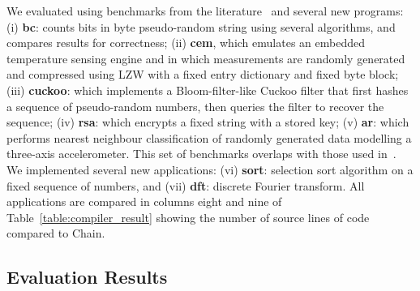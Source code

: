 We evaluated \sys using benchmarks from the literature~\cite{chain,alpaca} and
several new programs: (i) \textbf{bc}: counts bits in byte pseudo-random string
using several algorithms, and compares results for correctness; (ii)
\textbf{cem}, which emulates an embedded temperature sensing engine and in
which measurements are randomly generated and compressed using LZW with a fixed
entry dictionary and fixed byte block; (iii) \textbf{cuckoo}: which implements
a Bloom-filter-like Cuckoo filter that first hashes a sequence of pseudo-random
numbers, then queries the filter to recover the sequence; (iv) \textbf{rsa}:
which encrypts a fixed string with a stored key; (v) \textbf{ar}: which
performs nearest neighbour classification of randomly generated data modelling a
three-axis accelerometer. This set of benchmarks overlaps with those used
in~\cite{chain,alpaca}. We implemented several new applications: (vi)
\textbf{sort}: selection sort algorithm on a fixed sequence of numbers, and
(vii) \textbf{dft}: discrete Fourier transform. All applications are compared
in columns eight and nine of Table~\ref{table:compiler_result} showing the
number of source lines of code compared to Chain.


\subsection{\sys Evaluation Results}
\label{sec:results_evaluation}

